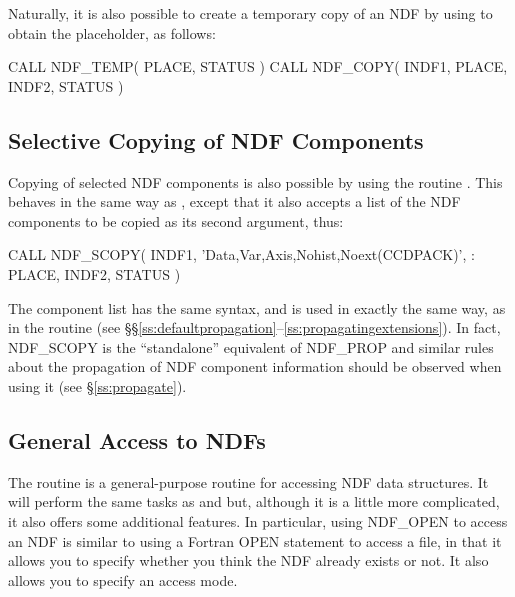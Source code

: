 \documentclass[twoside,11pt,nolof]{starlink}
\begin{document}
Naturally, it is also possible to create a temporary copy of an NDF by using
 to obtain the placeholder, as follows:

\small
\begin{terminalv}
      CALL NDF_TEMP( PLACE, STATUS )
      CALL NDF_COPY( INDF1, PLACE, INDF2, STATUS )
\end{terminalv}
\normalsize

\subsection{\label{ss:selectivecopy}Selective Copying of NDF Components}

Copying of selected NDF components is also possible by using the
routine . This behaves in the same way as , except
that it also accepts a list of the NDF components to be copied as its
second argument, thus:

\small
\begin{terminalv}
      CALL NDF_SCOPY( INDF1, 'Data,Var,Axis,Nohist,Noext(CCDPACK)',
     :                PLACE, INDF2, STATUS )
\end{terminalv}
\normalsize

The component list has the same syntax, and is used in exactly the same
way, as in the routine  (see
\S\S\ref{ss:defaultpropagation}--\ref{ss:propagatingextensions}). In
fact, NDF\_SCOPY is the ``standalone'' equivalent of NDF\_PROP and
similar rules about the propagation of NDF component information
should be observed when using it (see \S\ref{ss:propagate}).

\subsection{\label{ss:generalaccess}General Access to NDFs}

The routine  is a general-purpose routine for accessing NDF
data structures. It will perform the same tasks as  and
 but, although it is a little more complicated, it also
offers some additional features. In particular, using NDF\_OPEN to
access an NDF is similar to using a Fortran OPEN statement to access a
file, in that it allows you to specify whether you think the NDF
already exists or not. It also allows you to specify an access mode.
\end{document}

